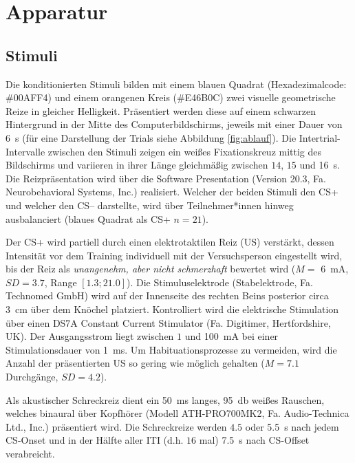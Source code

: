 
	\section{Apparatur}\label{apparatur}
		\subsection{Stimuli}\label{stimuli}
			Die konditionierten Stimuli bilden mit einem blauen Quadrat (Hexadezimalcode: \#00AFF4) und einem orangenen Kreis (\#E46B0C) zwei visuelle geometrische Reize in gleicher Helligkeit. Präsentiert werden diese auf einem schwarzen Hintergrund in der Mitte des Computerbildschirms, jeweils mit einer Dauer von \SI{6}{\second} (für eine Darstellung der Trials siehe Abbildung \ref{fig:ablauf}). Die Intertrial-Intervalle zwischen den Stimuli zeigen ein weißes Fixationskreuz mittig des Bildschirms und variieren in ihrer Länge gleichmäßig zwischen $14$, $15$ und \SI{16}{\second}. Die Reizpräsentation wird über die Software Presentation (Version 20.3, Fa. Neurobehavioral Systems, Inc.) realisiert.
			Welcher der beiden Stimuli den CS+ und welcher den CS-- darstellte, wird über Teilnehmer*innen hinweg ausbalanciert (blaues Quadrat als CS+ $n=21$).
		
			Der CS+ wird partiell durch einen elektrotaktilen Reiz (US) verstärkt, dessen Intensität vor dem Training individuell mit der Versuchsperson eingestellt wird, bis der Reiz als \textit{unangenehm, aber nicht schmerzhaft} bewertet wird ($M=$ \SI{6}{\milli\ampere}, $SD=3.7$, Range $\left[ 1.3;21.0\right]$).
			Die Stimuluselektrode (Stabelektrode, Fa. Technomed GmbH) wird auf der Innenseite des rechten Beins posterior circa \SI{3}{\centi\meter} über dem Knöchel platziert. Kontrolliert wird die elektrische Stimulation über einen DS7A Constant Current Stimulator (Fa. Digitimer, Hertfordshire, UK). Der Ausgangsstrom liegt zwischen $1$ und \SI{100}{\milli\ampere} bei einer Stimulationsdauer von \SI{1}{\milli\second}. Um Habituationsprozesse zu vermeiden, wird die Anzahl der präsentierten US so gering wie möglich gehalten ($M=7.1$ Durchgänge, $SD=4.2$).
	
			Als akustischer Schreckreiz dient ein \SI{50}{\milli\second} langes, \SI{95}{\decibel} weißes Rauschen, welches binaural über Kopfhörer (Modell ATH-PRO700MK2, Fa. Audio-Technica Ltd., Inc.) präsentiert wird. Die Schreckreize werden $4.5$ oder \SI{5.5}{\second} nach jedem CS-Onset und in der Hälfte aller ITI (d.h. $16$ mal) \SI{7.5}{\second} nach CS-Offset verabreicht.
				
